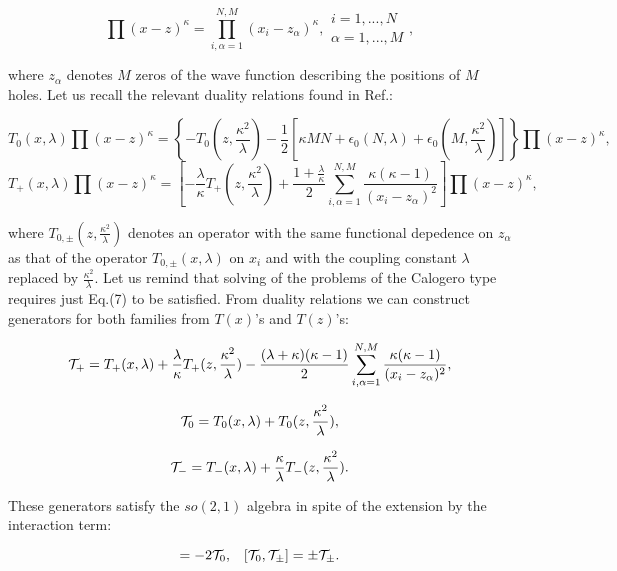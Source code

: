 \documentclass[a4paper,preprint,aps]{revtex4}
\begin{document}
\begin{equation}
	\prod(x-z)^{\kappa}=
	\prod_{i,\alpha=1}^{N,M}(x_{i}-z_{\alpha})^{\kappa},  
	\begin{array}{l}
	i=1,...,N\\
	\alpha=1,...,M
	\end{array} ,
\end{equation}

where $z_{\alpha}$ denotes $M$ zeros of the wave function describing the
 positions of $M$ holes. Let us recall the relevant duality relations found
 in Ref.\cite{AJ}:

\[
	 T_{0}(x,\lambda)\prod(x-z)^{\kappa}=
	\left\{
	-T_{0}(z,\frac{\kappa^{2}}{\lambda})-\frac{1}{2}
	\left[
	\kappa MN+\epsilon_{0}(N,\lambda)+
	\epsilon_{0}(M,\frac{\kappa^{2}}{\lambda})
	\right]
	\right\}
	\prod(x-z)^{\kappa} ,
\]
\begin{equation}	
	 T_{+}(x,\lambda)\prod(x-z)^{\kappa}=
	\left[
	-\frac{\lambda}{\kappa}T_{+}(z,\frac{\kappa^{2}}{\lambda})+
	\frac{1+\frac{\lambda}{\kappa}}{2}\sum_{i,\alpha=1}^{N,M}
	\frac{\kappa(\kappa-1)}{(x_{i}-z_{\alpha})^{2}}
	\right]
	\prod(x-z)^{\kappa} ,
\end{equation}

where $T_{0,\pm}(z,\frac{\kappa^2}{\lambda})$ denotes an operator with the
 same functional depedence on $z_{\alpha}$ as that of the operator
 $T_{0,\pm}(x,\lambda)$ on $x_{i}$ and with the coupling constant $\lambda$
 replaced by $\frac{\kappa^{2}}{\lambda}$. Let us remind that solving of the 
 problems of the Calogero type requires just Eq.(7) to be satisfied. From
 duality relations we can construct generators for both families from $T(x)$'s
 and $T(z)$'s:


\[	
	{\cal T_{+}}=
	T_{+}(x,\lambda)+\frac{\lambda}{\kappa}T_{+}(z,\frac{\kappa^{2}}
	{\lambda})-\frac{(\lambda+\kappa)(\kappa-1)}{2}\sum_{i,\alpha=1}^{N,M}
	\frac{\kappa(\kappa-1)}{(x_{i}-z_{\alpha})^{2}},
\]

\[ 
	{\cal T_{\rm 0}}=
	T_{0}(x,\lambda)+T_{0}(z,\frac{\kappa^{2}}{\lambda}),
\]

\begin{equation}
	{\cal T_{-}}=T_{-}(x,\lambda)+
	\frac{\kappa}{\lambda}T_{-}(z,\frac{\kappa^{2}}{\lambda}) .
\end{equation}

These generators satisfy the $so(2,1)$ algebra in spite of the extension by the
 interaction term:

  
\begin{equation}
	[{\cal T}_{+},{\cal T_{-}}]=-2 {\cal T}_{0},\;\;\;
	[{\cal T}_{0},{\cal T}_{\pm}]=\pm {\cal T}_{\pm}.
\end{equation}
\end{document}
